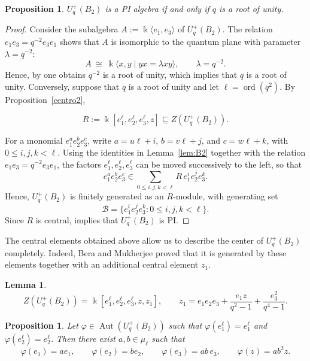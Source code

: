 \documentclass[11pt]{article}
\newtheorem{proposition}[theorem]{Proposition}
\newtheorem{lemma}[theorem]{Lemma}
\theoremstyle{definition}
\newcommand{\K}{\Bbbk}
\begin{document}
\begin{proposition}{\cite[Proposition 2.3]{BeraMukherjee2026UqB2}}\label{Propi}
 $U_q^{+}(B_2)$ is a PI algebra if and only if $q$ is a root of unity.
\end{proposition}
\begin{proof}
Consider the subalgebra $A:= \K\langle e_1,e_3\rangle$ of $U_q^{+}(B_2)$. The relation  $e_1e_3=q^{-2}e_3e_1$ shows that $A$ is isomorphic to the quantum plane with parameter $\lambda=q^{-2}$:
\[
A\ \cong\  \K\langle x,y\mid yx=\lambda xy\rangle,\qquad \lambda=q^{-2}.
\]
Hence, by \cite[Section \S 7.1]{DeConciniProcesi1993} one obtains  $q^{-2}$ is a root of unity, which implies that $q$ is a root of unity. Conversely, suppose that \(q\) is a root of unity and let
\(\ell=\operatorname{ord}(q^2)\). By
Proposition~\ref{centro2},

$$
R:=\K[e_1^\ell,e_2^\ell,e_3^\ell,z]
\subseteq Z(U_q^{+}(B_2)).
$$

For a monomial \(e_1^ae_2^be_3^c\), write
\(a=u\ell+i\), \(b=v\ell+j\), and \(c=w\ell+k\), with
\(0\leq i,j,k<\ell\). Using the identities in
Lemma~\ref{lem:B2} together with the relation
\(e_1e_3=q^{-2}e_3e_1\), the factors
\(e_1^\ell,e_2^\ell,e_3^\ell\) can be moved successively to the left, so that
$$
e_1^ae_2^be_3^c
\in
\sum_{0\leq i,j,k<\ell}
R\,e_1^ie_2^je_3^k.
$$
Hence, \(U_q^{+}(B_2)\) is finitely generated as an \(R\)-module, with
generating set
$$
\mathcal B=
\{e_1^ie_2^je_3^k:0\leq i,j,k<\ell\}.
$$
Since \(R\) is central, \cite[Corollary~13.1.13]{mcconnell} implies that
\(U_q^{+}(B_2)\) is PI.
\end{proof}
The central elements obtained above allow us to describe the center of \(U_q^{+}(B_2)\) completely. Indeed, Bera and Mukherjee \cite[Theorem~9.2]{BeraMukherjee2026UqB2} proved that it is generated by these elements together with an additional central element \(z_1\).
\begin{lemma}{\cite[Theorem~9.2]{BeraMukherjee2026UqB2}}
\label{centroU}
$$
Z\!\left(U_q^{+}(B_2)\right)
=
\K[e_1^\ell,e_2^\ell,e_3^\ell,z,z_1],
\qquad
z_1
=
e_1e_2e_3
+
\frac{e_1z}{q^2-1}
+
\frac{e_3^2}{q^4-1}.
$$
\end{lemma}
\begin{proposition}
\label{rigidez-ozono-UqB2}
Let \(\varphi\in\operatorname{Aut}(U_q^+(B_2))\) such that
\(\varphi(e_1^\ell)=e_1^\ell\) and \(\varphi(e_2^\ell)=e_2^\ell\). Then
there exist \(a,b\in\mu_\ell\) such that
$$
\varphi(e_1)=ae_1,\qquad
\varphi(e_2)=be_2,\qquad
\varphi(e_3)=ab\,e_3,\qquad
\varphi(z)=ab^2z.
$$
\end{proposition}
\end{document}
